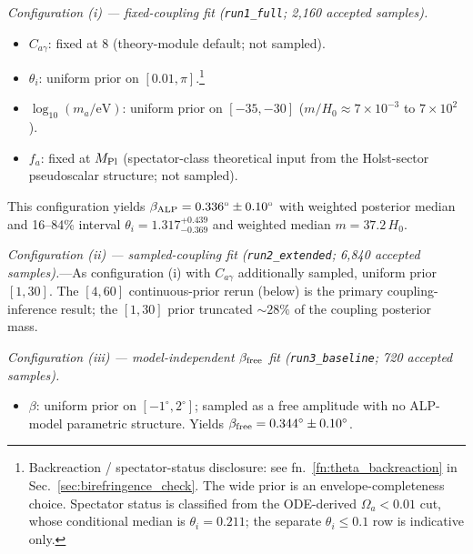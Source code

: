 \documentclass[aps,prd,twocolumn,superscriptaddress,showpacs,preprintnumbers,nofootinbib,longbibliography,floatfix]{revtex4-2}
\newcommand{\MPl}{M_{\rm Pl}}
\begin{document}
\textit{Configuration (i) --- fixed-coupling fit (\texttt{run1\_full};
2{,}160 accepted samples).}
\begin{itemize}[leftmargin=*]
\item $C_{a\gamma}$: fixed at $8$ (theory-module default; not sampled).
\item $\theta_i$: uniform prior on $[0.01, \pi]$.\footnote{Backreaction /
spectator-status disclosure: see fn.~\ref{fn:theta_backreaction} in
Sec.~\ref{sec:birefringence_check}. The wide prior is an
envelope-completeness choice. Spectator status is classified from the
ODE-derived $\Omega_a<0.01$ cut, whose conditional median is
$\theta_i=0.211$; the separate $\theta_i\le0.1$ row is indicative only.}
\item $\log_{10}(m_a/\text{eV})$: uniform prior on $[-35, -30]$
($m/H_0 \approx 7\times 10^{-3}$ to $7\times 10^{2}$).
\item $f_a$: fixed at $\MPl$ (spectator-class theoretical input from the
Holst-sector pseudoscalar structure; not sampled).
\end{itemize}
This configuration yields $\beta_{\rm ALP} = 0.336^\circ\pm 0.10^\circ$
with weighted posterior median and 16--84\% interval
$\theta_i=1.317^{+0.439}_{-0.369}$ and weighted median $m=37.2\,H_0$.

\textit{Configuration (ii) --- sampled-coupling fit
(\texttt{run2\_extended}; 6{,}840 accepted samples).}---As configuration
(i) with $C_{a\gamma}$ additionally sampled, uniform prior $[1,30]$.
The $[4,60]$ continuous-prior rerun (below) is the primary coupling-inference
result; the $[1,30]$ prior truncated ${\sim}28\%$ of the coupling
posterior mass.

\textit{Configuration (iii) --- model-independent $\beta_{\rm free}$ fit
(\texttt{run3\_baseline}; 720 accepted samples).}
\begin{itemize}[leftmargin=*]
\item $\beta$: uniform prior on $[-1^\circ, 2^\circ]$; sampled as a free
amplitude with no ALP-model parametric structure. Yields
$\beta_{\rm free} = 0.344^\circ \pm 0.10^\circ$.
\end{itemize}
\end{document}
